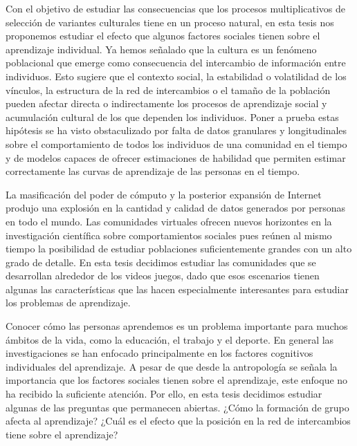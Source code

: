 \documentclass[a4paper,10pt]{book}
\theoremstyle{definition}
\begin{document}
Con el objetivo de estudiar las consecuencias que los procesos multiplicativos de selecci\'on de variantes culturales tiene en un proceso natural, en esta tesis nos proponemos estudiar el efecto que algunos factores sociales tienen sobre el aprendizaje individual. 
%
Ya hemos señalado que la cultura es un fen\'omeno poblacional que emerge como consecuencia del intercambio de informaci\'on entre individuos.
%
Esto sugiere que el contexto social, la estabilidad o volatilidad de los v\'inculos, la estructura de la red de intercambios o el tama\~no de la poblaci\'on pueden afectar directa o indirectamente los procesos de aprendizaje social y acumulaci\'on cultural de los que dependen los individuos.
%
Poner a prueba estas hip\'otesis se ha visto obstaculizado por falta de datos granulares y longitudinales sobre el comportamiento de todos los individuos de una comunidad en el tiempo y de modelos capaces de ofrecer estimaciones de habilidad que permiten estimar correctamente las curvas de aprendizaje de las personas en el tiempo.


La masificaci\'on del poder de c\'omputo y la posterior expansi\'on de Internet produjo una explosi\'on en la cantidad y calidad de datos generados por personas en todo el mundo.
%
Las comunidades virtuales ofrecen nuevos horizontes en la investigaci\'on cient\'ifica sobre comportamientos sociales pues re\'unen al mismo tiempo la posibilidad de estudiar poblaciones suficientemente grandes con un alto grado de detalle.
%
En esta tesis decidimos estudiar las comunidades que se desarrollan alrededor de los videos juegos, dado que esos escenarios tienen algunas las caracter\'isticas que las hacen especialmente interesantes para estudiar los problemas de aprendizaje.


Conocer c\'omo las personas aprendemos es un problema importante para muchos \'ambitos de la vida, como la educaci\'on, el trabajo y el deporte.
%
En general las investigaciones se han enfocado principalmente en los factores cognitivos individuales del aprendizaje.
%
A pesar de que desde la antropolog\'ia se se\~nala la importancia que los factores sociales tienen sobre el aprendizaje, este enfoque no ha recibido la suficiente atenci\'on.
%
Por ello, en esta tesis decidimos estudiar algunas de las preguntas que permanecen abiertas.
%
¿C\'omo la formaci\'on de grupo afecta al aprendizaje?
%
¿Cu\'al es el efecto que la posici\'on en la red de intercambios tiene sobre el aprendizaje?
\end{document}

